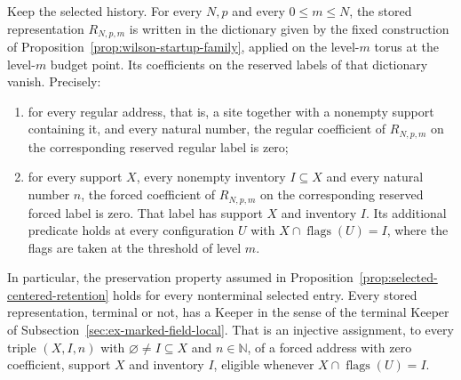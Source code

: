 \begin{lemma}
\label{lem:selected-reserved-slots}
Keep the selected history. For every $N,p$ and every $0\le m\le N$,
the stored representation $R_{N,p,m}$ is written in the dictionary given
by the fixed construction of
Proposition~\ref{prop:wilson-startup-family}, applied on the level-$m$
torus at the level-$m$ budget point. Its coefficients on the reserved
labels of that dictionary vanish. Precisely:
\begin{enumerate}
\item for every regular address, that is, a site together with a
  nonempty support containing it, and every natural number, the regular
  coefficient of $R_{N,p,m}$ on the corresponding reserved regular
  label is zero;
\item for every support $X$, every nonempty inventory $I\subseteq X$
  and every natural number $n$, the forced coefficient of $R_{N,p,m}$ on
  the corresponding reserved forced label is zero. That label has support
  $X$ and inventory $I$. Its additional predicate holds at every
  configuration $U$ with $X\cap\operatorname{flags}(U)=I$, where the
  flags are taken at the threshold of level $m$.
\end{enumerate}
In particular, the preservation property assumed in
Proposition~\ref{prop:selected-centered-retention} holds for every
nonterminal selected entry. Every stored representation, terminal or
not, has a Keeper in the sense of the terminal Keeper of
Subsection~\ref{sec:ex-marked-field-local}. That is an injective
assignment, to every triple $(X,I,n)$ with $\varnothing\ne I\subseteq X$
and $n\in\mathbb N$, of a forced address with zero coefficient, support
$X$ and inventory $I$, eligible whenever
$X\cap\operatorname{flags}(U)=I$.
\end{lemma}


